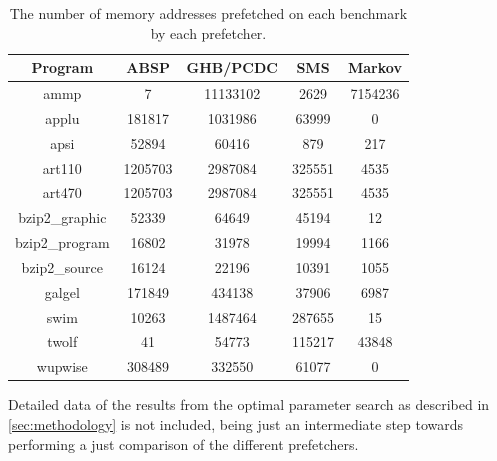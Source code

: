 \begin{table}[htbp]
  \centering
  \begin{tabular}{|c|c|c|c|c|}
    \hline
    \textbf{Program} & \textbf{ABSP} & \textbf{GHB/PCDC} & \textbf{SMS} & \textbf{Markov} \\ \hline
    ammp             & 7             & 11133102          & 2629         & 7154236 \\ \hline
    applu            & 181817        & 1031986           & 63999        & 0 \\ \hline
    apsi             & 52894         & 60416             & 879          & 217 \\ \hline
    art110           & 1205703       & 2987084           & 325551       & 4535 \\ \hline
    art470           & 1205703       & 2987084           & 325551       & 4535 \\ \hline
    bzip2\_graphic   & 52339         & 64649             & 45194        & 12 \\ \hline
    bzip2\_program   & 16802         & 31978             & 19994        & 1166 \\ \hline
    bzip2\_source    & 16124         & 22196             & 10391        & 1055 \\ \hline
    galgel           & 171849        & 434138            & 37906        & 6987 \\ \hline
    swim             & 10263         & 1487464           & 287655       & 15 \\ \hline
    twolf            & 41            & 54773             & 115217       & 43848 \\ \hline
    wupwise          & 308489        & 332550            & 61077        & 0 \\ \hline
  \end{tabular}
  \caption{The number of memory addresses prefetched on each benchmark by each prefetcher.}
  \label{tab:numPrefetches}
\end{table}


Detailed data of the results from the optimal parameter search as
described in \autoref{sec:methodology} is not included, being just an
intermediate step towards performing a just comparison of the
different prefetchers.


